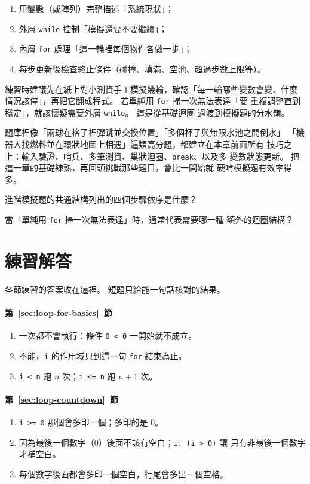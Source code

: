 \begin{enumerate}
    \item 用變數（或陣列）完整描述「系統現狀」；
    \item 外層 \texttt{while} 控制「模擬還要不要繼續」；
    \item 內層 \texttt{for} 處理「這一輪裡每個物件各做一步」；
    \item 每步更新後檢查終止條件（碰撞、填滿、空池、超過步數上限等）。
\end{enumerate}

練習時建議先在紙上對小測資手工模擬幾輪，確認「每一輪哪些變數會變、什麼
情況該停」，再把它翻成程式。 若單純用 \texttt{for} 掃一次無法表達「要
重複調整直到穩定」，就該懷疑需要外層 \texttt{while}。 這是從基礎迴圈
過渡到模擬題的分水嶺。

題庫裡像「兩球在格子裡彈跳並交換位置」「多個杯子與無限水池之間倒水」
「機器人找燃料並在環狀地圖上相遇」這類高分題，都建立在本章前面所有
技巧之上：輸入驗證、哨兵、多筆測資、巢狀迴圈、\texttt{break}、以及多
變數狀態更新。 把這一章的基礎練熟，再回頭挑戰那些題目，會比一開始就
硬啃模擬題有效率得多。

\begin{drills}[label=drills:loop-advanced-sim]
\item 進階模擬題的共通結構列出的四個步驟依序是什麼？
\item 當「單純用 \texttt{for} 掃一次無法表達」時，通常代表需要哪一種
額外的迴圈結構？
\end{drills}

\section*{練習解答}

各節練習的答案收在這裡。 短題只給能一句話核對的結果。

\paragraph{第~\ref{sec:loop-for-basics}~節}
\begin{enumerate}
\item 一次都不會執行：條件 \texttt{0 < 0} 一開始就不成立。
\item 不能，\texttt{i} 的作用域只到這一句 \texttt{for} 結束為止。
\item \texttt{i < n} 跑 $n$ 次；\texttt{i <= n} 跑 $n + 1$ 次。
\end{enumerate}

\paragraph{第~\ref{sec:loop-countdown}~節}
\begin{enumerate}
\item \texttt{i >= 0} 那個會多印一個；多印的是 $0$。
\item 因為最後一個數字（$0$）後面不該有空白；\texttt{if (i > 0)} 讓
只有非最後一個數字才補空白。
\item 每個數字後面都會多印一個空白，行尾會多出一個空格。
\end{enumerate}

